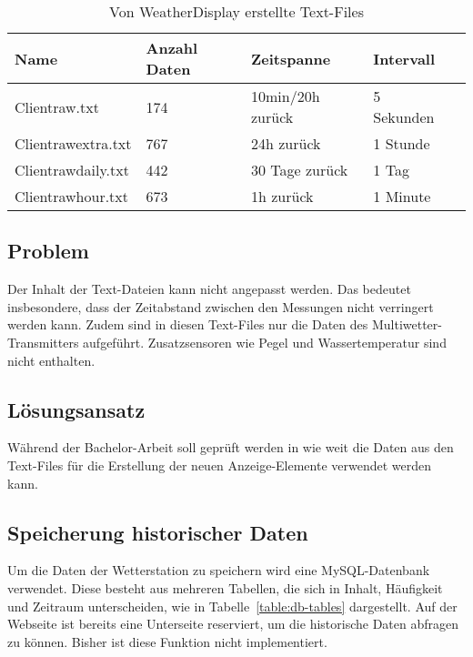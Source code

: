 \begin{table}[h!]
\centering
\begin{tabular}{|l|l|l|l|l|}
\hline
 Name			&  Anzahl Daten	& 	Zeitspanne  		& 	Intervall			\\ \hline
 Clientraw.txt 		&  174			&  	10min/20h zurück 	& 	5 Sekunden 		\\ \hline
 Clientrawextra.txt	&  767 			&  	24h zurück 		& 	1 Stunde 			\\ \hline
 Clientrawdaily.txt 	&  442 			&  	30 Tage zurück 	&  	1 Tag 			\\ \hline
 Clientrawhour.txt	&  673			&  	1h zurück 			& 	1 Minute 			\\ \hline
\end{tabular}
\caption{Von WeatherDisplay erstellte Text-Files}
\label{table:text-files}
\end{table}


\subsection*{Problem}
Der Inhalt der Text-Dateien kann nicht angepasst werden. Das bedeutet insbesondere, dass der Zeitabstand zwischen den Messungen nicht verringert werden kann. Zudem sind in diesen Text-Files nur die Daten des Multiwetter-Transmitters aufgeführt. Zusatzsensoren wie Pegel und Wassertemperatur sind nicht enthalten.

\subsection*{Lösungsansatz}
Während der Bachelor-Arbeit soll geprüft werden in wie weit die Daten aus den Text-Files für die Erstellung der neuen Anzeige-Elemente verwendet werden kann. 


%
%
%

\subsection{Speicherung historischer Daten}
Um die Daten der Wetterstation zu speichern wird eine MySQL-Datenbank verwendet. Diese besteht aus mehreren Tabellen, die sich in Inhalt, Häufigkeit und Zeitraum unterscheiden, wie in Tabelle~\ref{table:db-tables} dargestellt. Auf der Webseite ist bereits eine Unterseite reserviert, um die historische Daten abfragen zu können. Bisher ist diese Funktion nicht implementiert.

